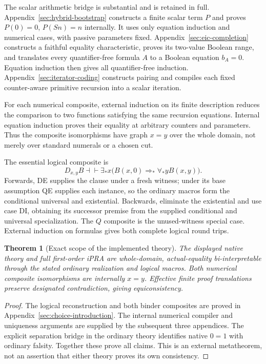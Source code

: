 \documentclass[11pt,letterpaper]{article}
\newtheorem{theorem}{Theorem}[section]
\theoremstyle{definition}\newtheorem{definition}[theorem]{Definition}
\theoremstyle{remark}\newtheorem{remark}[theorem]{Remark}
\begin{document}
The scalar arithmetic bridge is substantial and is retained in full.
Appendix~\ref{sec:hybrid-bootstrap} constructs a finite scalar term
$P$ and proves $P(0)=0$, $P(Sn)=n$ internally. It uses only
equation induction and numerical cases, with passive parameters fixed.
Appendix~\ref{sec:eic-completion} constructs a faithful equality
characteristic, proves its two-value Boolean range, and translates
every quantifier-free formula $A$ to a Boolean equation $b_A=0$.
Equation induction then gives all quantifier-free induction.
Appendix~\ref{sec:iterator-coding} constructs pairing and compiles
each fixed counter-aware primitive recursion into a scalar iteration.

For each numerical composite, external induction on its finite
description reduces the comparison to two functions satisfying the
same recursion equations. Internal equation induction proves their
equality at arbitrary counters and parameters. Thus the composite
isomorphisms have graph $x=y$ over the whole domain, not merely over
standard numerals or a chosen cut.

The essential logical composite is
\[
 D_{x,y}B\dashv\vdash
 \exists_*x\bigl(B(x,0)\Rightarrow_*\forall_*yB(x,y)\bigr).
\]
Forwards, DE supplies the clause under a fresh witness; under its
base assumption QE supplies each instance, so the ordinary macros
form the conditional universal and existential. Backwards, eliminate
the existential and use case DI, obtaining its successor premise
from the supplied conditional and universal specialization.
The $Q$ composite is the unused-witness special case. External
induction on formulas gives both complete logical round trips.

\begin{theorem}[Exact scope of the implemented theory]
The displayed native theory and full first-order iPRA are
whole-domain, actual-equality bi-interpretable through the stated
ordinary realization and logical macros. Both numerical composite
isomorphisms are internally $x=y$. Effective finite proof translations
preserve designated contradiction, giving equiconsistency.
\end{theorem}
\begin{proof}
The logical reconstruction and both binder composites are proved
in Appendix~\ref{sec:choice-introduction}. The internal numerical
compiler and uniqueness arguments are supplied by the subsequent
three appendices. The explicit separation bridge in the ordinary
theory identifies native $0=1$ with ordinary falsity. Together these
prove all claims. This is an external metatheorem, not an assertion
that either theory proves its own consistency.
\end{proof}
\end{document}
